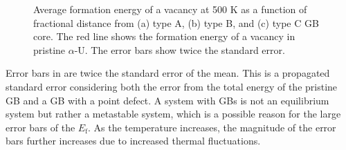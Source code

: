 \documentclass[review]{elsarticle}
\providecommand{\DIFaddbeginFL}{} %
\providecommand{\DIFaddendFL}{} %
\providecommand{\DIFdelbeginFL}{} %
\providecommand{\DIFdelendFL}{} %
\newcommand{\DIFscaledelfig}{0.5}
\newlength{\DIFdelgraphicswidth} %
\newlength{\DIFdelgraphicsheight} %
\newcommand{\DIFaddincludegraphics}[2][]{{\color{blue}\fbox{\DIFOincludegraphics[#1]{#2}}}} %
\newcommand{\DIFdelincludegraphics}[2][]{%
\sbox{\DIFdelgraphicsbox}{\DIFOincludegraphics[#1]{#2}}%
\settoboxwidth{\DIFdelgraphicswidth}{\DIFdelgraphicsbox} %
\settoboxtotalheight{\DIFdelgraphicsheight}{\DIFdelgraphicsbox} %
\scalebox{\DIFscaledelfig}{%
\parbox[b]{\DIFdelgraphicswidth}{\usebox{\DIFdelgraphicsbox}\\[-\baselineskip] \rule{\DIFdelgraphicswidth}{0em}}\llap{\resizebox{\DIFdelgraphicswidth}{\DIFdelgraphicsheight}{%
\setlength{\unitlength}{\DIFdelgraphicswidth}%
\begin{picture}(1,1)%
\thicklines\linethickness{2pt} %
{\color[rgb]{1,0,0}\put(0,0){\framebox(1,1){}}}%
{\color[rgb]{1,0,0}\put(0,0){\line( 1,1){1}}}%
{\color[rgb]{1,0,0}\put(0,1){\line(1,-1){1}}}%
\end{picture}%
}\hspace*{3pt}}} %
} %
\DeclareRobustCommand{\DIFaddbeginFL}{\DIFOaddbeginFL \let\includegraphics\DIFaddincludegraphics} %
\DeclareRobustCommand{\DIFaddendFL}{\DIFOaddendFL \let\includegraphics\DIFOincludegraphics} %
\DeclareRobustCommand{\DIFdelbeginFL}{\DIFOdelbeginFL \let\includegraphics\DIFdelincludegraphics} %
\DeclareRobustCommand{\DIFdelendFL}{\DIFOaddendFL \let\includegraphics\DIFOincludegraphics} %
\begin{document}
\begin{figure}[h!]
\centering
\DIFdelbeginFL %
\DIFdelendFL \DIFaddbeginFL {} 
\DIFaddendFL \caption{Average formation energy of a vacancy at 500 K as a function of fractional distance from (a) type A, (b) type B, and (c) type C GB core. The red line shows the formation energy of a vacancy in pristine $\alpha$-U. The error bars show twice the standard error.}
\label{fig:Seg_vacancy_500}
\end{figure}

\par Error bars in  are twice the standard error of the mean. This is a propagated standard error considering both the error from the total energy of the pristine GB and a GB with a point defect. A system with GBs is not an equilibrium system but rather a metastable system, which is a possible reason for the large error bars of the $E_{\mathrm{f}}$. As the temperature increases, the magnitude of the error bars further increases due to increased thermal fluctuations.
\end{document}
